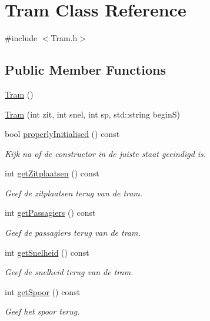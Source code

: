 \hypertarget{class_tram}{}\section{Tram Class Reference}
\label{class_tram}


{\ttfamily \#include $<$Tram.\+h$>$}

\subsection*{Public Member Functions}
\begin{DoxyCompactItemize}
\item 
\hyperlink{class_tram_aad83b2e7e79d57528691bf317ab0e1ef}{Tram} ()
\item 
\hyperlink{class_tram_afef6559a85225dc0b8a9445d6d16cbbb}{Tram} (int zit, int snel, int sp, std\+::string beginS)
\item 
bool \hyperlink{class_tram_ac2688f590e4db232b4f535c9bf959efb}{properly\+Initialised} () const
\begin{DoxyCompactList}\small\item\em Kijk na of de constructor in de juiste staat geeindigd is. \end{DoxyCompactList}\item 
int \hyperlink{class_tram_abcb1ce0d10e394fce8a99b460e5104de}{get\+Zitplaatsen} () const
\begin{DoxyCompactList}\small\item\em Geef de zitplaatsen terug van de tram. \end{DoxyCompactList}\item 
int \hyperlink{class_tram_a678ba2cd0c6ab76e966947944f599d56}{get\+Passagiers} () const
\begin{DoxyCompactList}\small\item\em Geef de passagiers terug van de tram. \end{DoxyCompactList}\item 
int \hyperlink{class_tram_aa8bcd980469801cb8524f170006f666c}{get\+Snelheid} () const
\begin{DoxyCompactList}\small\item\em Geef de snelheid terug van de tram. \end{DoxyCompactList}\item 
int \hyperlink{class_tram_a46c37aab218c334dac8b5340647f53ab}{get\+Spoor} () const
\begin{DoxyCompactList}\small\item\em Geef het spoor terug. \end{DoxyCompactList}\item 

\end{DoxyCompactItemize}
